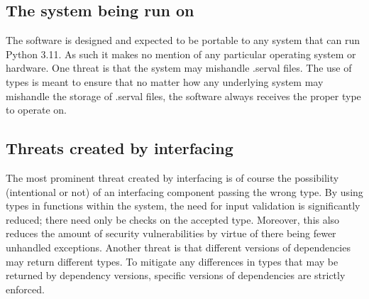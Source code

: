 \documentclass[12pt, letterpaper]{article}
\begin{document}
\subsection{The system being run on}

The software is designed and expected to be portable to any system that can run Python 3.11. As such it makes no mention of any particular operating system or hardware. One threat is that the system may mishandle .serval files. The use of types is meant to ensure that no matter how any underlying system may mishandle the storage of .serval files, the software always receives the proper type to operate on. 

\subsection{Threats created by interfacing}

The most prominent threat created by interfacing is of course the possibility (intentional or not) of an interfacing component passing the wrong type. By using types in functions within the system, the need for input validation is significantly reduced; there need only be checks on the accepted type. Moreover, this also reduces the amount of security vulnerabilities by virtue of there being fewer unhandled exceptions. Another threat is that different versions of dependencies may return different types. To mitigate any differences in types that may be returned by dependency versions, specific versions of dependencies are strictly enforced.

\end{document}
